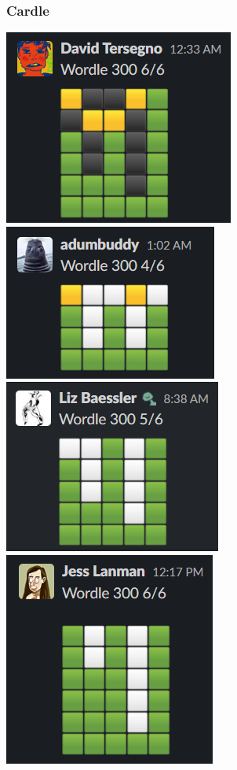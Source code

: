\documentclass[aspectratio=169,12pt]{beamer}
\begin{document}
	\begin{frame}
		\frametitle{Cardle}
		\hfill
		\includegraphics[width=0.2\linewidth]{pix/david}\hfill
		\includegraphics[width=0.2\linewidth]{pix/adam}\hfill
		\includegraphics[width=0.2\linewidth]{pix/liz}\hfill
		\includegraphics[width=0.2\linewidth]{pix/jess}\hfill\\
		
		\begin{center}
		\begin{tabular}{cccc}
	

\end{tabular}
\end{center}
\end{frame}
\end{document}
